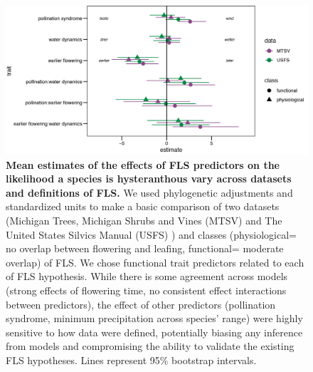 \documentclass[11pt]{article}
\begin{document}
\begin{figure}[H]
    \centering
 \includegraphics[width=\textwidth]{..//..//MTSV_USFS/MTSV_USFS.png} 
    \caption{\textbf{Mean estimates of the effects of FLS predictors on the likelihood a species is hysteranthous vary across datasets and definitions of FLS.}  We used phylogenetic adjustments and standardized units to make a basic comparison of two datasets (Michigan Trees, Michigan Shrubs and Vines (MTSV) \citep{Barnes2004,Barnes2016} and The United States Silvics Manual (USFS) \citep{Burns1990}) and classes (physiological= no overlap between flowering and leafing, functional= moderate overlap) of FLS. We chose functional trait predictors related to each of FLS hypothesis. While there is some agreement across models (strong effects of flowering time, no consistent effect interactions between predictors), the effect of other predictors (pollination syndrome, minimum precipitation across species' range) were highly sensitive to how data were defined, potentially biasing any inference from models and compromising the ability to validate the existing FLS hypotheses. Lines represent 95\% bootstrap intervals.}
    \label{fig:muplots.USMT}
\end{figure}
\end{document}
